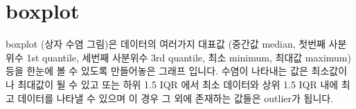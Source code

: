 \documentclass[
]{book}
\newenvironment{Shaded}{\begin{snugshade}}{\end{snugshade}}
\newcommand{\AttributeTok}[1]{\textcolor[rgb]{0.77,0.63,0.00}{#1}}
\newcommand{\DecValTok}[1]{\textcolor[rgb]{0.00,0.00,0.81}{#1}}
\newcommand{\FunctionTok}[1]{\textcolor[rgb]{0.00,0.00,0.00}{#1}}
\newcommand{\NormalTok}[1]{#1}
\newcommand{\OtherTok}[1]{\textcolor[rgb]{0.56,0.35,0.01}{#1}}
\newcommand{\SpecialCharTok}[1]{\textcolor[rgb]{0.00,0.00,0.00}{#1}}
\newcommand{\StringTok}[1]{\textcolor[rgb]{0.31,0.60,0.02}{#1}}
\begin{document}
\begin{Shaded}
\end{Shaded}

\hypertarget{boxplot}{%
\section{boxplot}\label{boxplot}}

boxplot (상자 수염 그림)은 데이터의 여러가지 대표값 (중간값 median, 첫번째 사분위수 1st quantile, 세번째 사분위수 3rd quantile, 최소 minimum, 최대값 maximum) 등을 한눈에 볼 수 있도록 만들어놓은 그래프 입니다. 수염이 나타내는 값은 최소값이나 최대값이 될 수 있고 또는 하위 1.5 IQR 에서 최소 데이터와 상위 1.5 IQR 내에 최고 데이터를 나타낼 수 있으며 이 경우 그 외에 존재하는 값들은 outlier가 됩니다.
\end{document}

